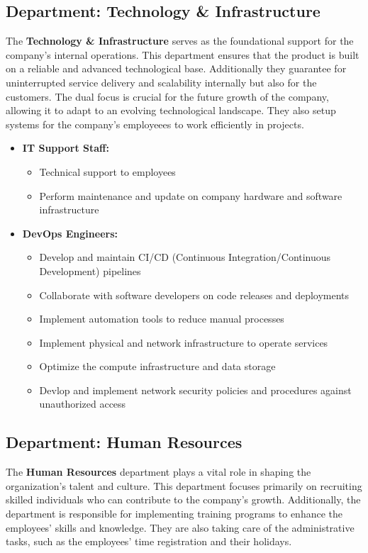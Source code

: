 \subsection{Department: Technology \& Infrastructure}
The \textbf{Technology \& Infrastructure} serves as the foundational support for the company's internal operations.
This department ensures that the product is built on a reliable and advanced technological base.
Additionally they guarantee for uninterrupted service delivery and scalability internally but also for the customers.
The dual focus is crucial for the future growth of the company, allowing it to adapt to an evolving technological landscape.
They also setup systems for the company's employeees to work efficiently in projects.
\begin{itemize}
    \item \textbf{IT Support Staff:}
            \begin{itemize}
                \item Technical support to employees
                \item Perform maintenance and update on company hardware and software infrastructure
            \end{itemize}
    \item \textbf{DevOps Engineers:}
            \begin{itemize}
                \item Develop and maintain CI/CD (Continuous Integration/Continuous Development) pipelines
                \item Collaborate with software developers on code releases and deployments
                \item Implement automation tools to reduce manual processes
                \item Implement physical and network infrastructure to operate services
                \item Optimize the compute infrastructure and data storage
                \item Devlop and implement network security policies and procedures against unauthorized access
            \end{itemize}
\end{itemize}

\subsection{Department: Human Resources}
The \textbf{Human Resources} department plays a vital role in shaping the organization's talent and culture.
This department focuses primarily on recruiting skilled individuals who can contribute to the company's growth.
Additionally, the department is responsible for implementing training programs to enhance the employees' skills and knowledge.
They are also taking care of the administrative tasks, such as the employees' time registration and their holidays.


